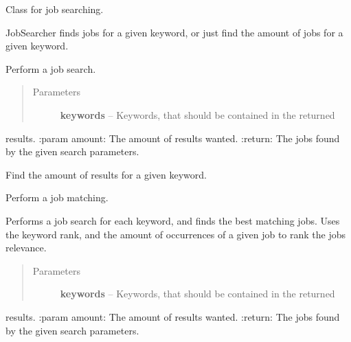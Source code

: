 \documentclass[letterpaper,10pt,english]{sphinxmanual}
\begin{document}
\begin{fulllineitems}
\label{job_searcher:job_searcher.JobSearcher}
Class for job searching.

JobSearcher finds jobs for a given keyword, or just
find the amount of jobs for a given keyword.

\begin{fulllineitems}
\label{job_searcher:job_searcher.JobSearcher.find_results}
Perform a job search.
\begin{quote}\begin{description}
\item[{Parameters}] \leavevmode
\textbf{keywords} -- Keywords, that should be contained in the returned

\end{description}\end{quote}

results.
:param amount: The amount of results wanted.
:return: The jobs found by the given search parameters.

\end{fulllineitems}


\begin{fulllineitems}
\label{job_searcher:job_searcher.JobSearcher.find_results_amount}
Find the amount of results for a given keyword.

\end{fulllineitems}


\begin{fulllineitems}
\label{job_searcher:job_searcher.JobSearcher.find_results_best_match}
Perform a job matching.

Performs a job search for each keyword, and finds the best matching
jobs. Uses the keyword rank, and the amount of occurrences of a given
job to rank the jobs relevance.
\begin{quote}\begin{description}
\item[{Parameters}] \leavevmode
\textbf{keywords} -- Keywords, that should be contained in the returned

\end{description}\end{quote}

results.
:param amount: The amount of results wanted.
:return: The jobs found by the given search parameters.

\end{fulllineitems}


\end{fulllineitems}
\end{document}
